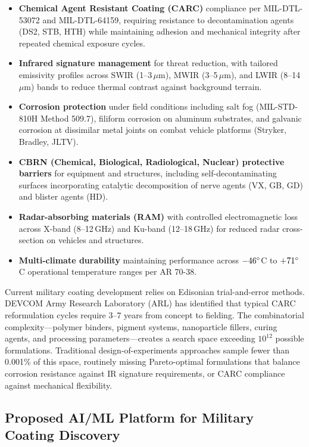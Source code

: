 \documentclass[11pt,letterpaper]{article}
\begin{document}
\begin{itemize}[nosep]
  \item \textbf{Chemical Agent Resistant Coating (CARC)} compliance per MIL-DTL-53072 and MIL-DTL-64159, requiring resistance to decontamination agents (DS2, STB, HTH) while maintaining adhesion and mechanical integrity after repeated chemical exposure cycles.
  \item \textbf{Infrared signature management} for threat reduction, with tailored emissivity profiles across SWIR (1--3\,$\mu$m), MWIR (3--5\,$\mu$m), and LWIR (8--14\,$\mu$m) bands to reduce thermal contrast against background terrain.
  \item \textbf{Corrosion protection} under field conditions including salt fog (MIL-STD-810H Method 509.7), filiform corrosion on aluminum substrates, and galvanic corrosion at dissimilar metal joints on combat vehicle platforms (Stryker, Bradley, JLTV).
  \item \textbf{CBRN (Chemical, Biological, Radiological, Nuclear) protective barriers} for equipment and structures, including self-decontaminating surfaces incorporating catalytic decomposition of nerve agents (VX, GB, GD) and blister agents (HD).
  \item \textbf{Radar-absorbing materials (RAM)} with controlled electromagnetic loss across X-band (8--12\,GHz) and Ku-band (12--18\,GHz) for reduced radar cross-section on vehicles and structures.
  \item \textbf{Multi-climate durability} maintaining performance across $-46\degree$C to $+71\degree$C operational temperature ranges per AR 70-38.
\end{itemize}

Current military coating development relies on Edisonian trial-and-error methods. DEVCOM Army Research Laboratory (ARL) has identified that typical CARC reformulation cycles require 3--7 years from concept to fielding. The combinatorial complexity---polymer binders, pigment systems, nanoparticle fillers, curing agents, and processing parameters---creates a search space exceeding $10^{12}$ possible formulations. Traditional design-of-experiments approaches sample fewer than 0.001\% of this space, routinely missing Pareto-optimal formulations that balance corrosion resistance against IR signature requirements, or CARC compliance against mechanical flexibility.

\subsection{Proposed AI/ML Platform for Military Coating Discovery}
\end{document}
